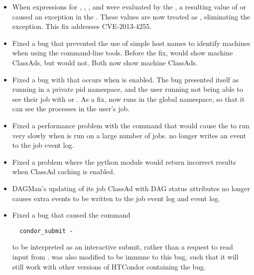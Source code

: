 \begin{itemize}

\item When expressions for ,
, , and 
were evaluated by the ,
a resulting value of
 or  caused an exception in the .
These values are now treated as ,
eliminating the exception.
This fix addresses CVE-2013-4255.

\item Fixed a bug that prevented the use of simple host names to identify
machines when using the command-line tools. Before the fix,
 would show machine ClassAds, but
 would not.
Both now show machine ClassAds.

\item Fixed a bug with  that occurs when
 is enabled.
The bug presented itself as 
running in a private pid namespace, 
and the user running  not being able to see 
their job with  or .
As a fix,  now runs in the global namespace, 
so that it can see the processes in the user's job.

\item Fixed a performance problem with the  command 
that would cause the  to run very slowly when 
 is run on a large number of jobs.  
 no longer writes an event to the job event log. 

\item Fixed a problem where the  python module would return
incorrect results when ClassAd caching is enabled.

\item DAGMan's updating of its job ClassAd with DAG status attributes no
longer causes extra events to be written to the job event log and event log.

\item Fixed a bug that caused the command
\begin{verbatim}
  condor_submit -
\end{verbatim}
to be interpreted as an interactive submit,
rather than a request to read input from .
 was also modified to be immune to this bug,
such that it will still work with other versions of HTCondor containing
the bug.


\end{itemize}
